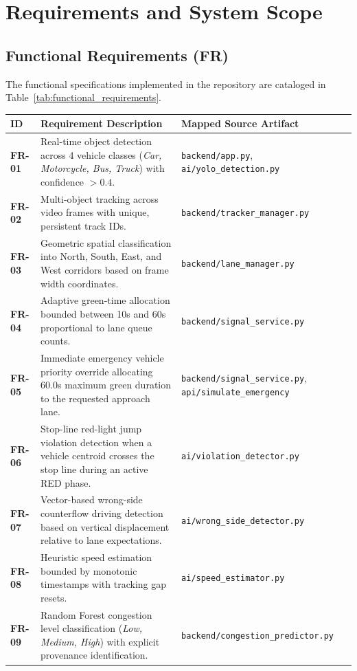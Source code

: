 \chapter{Requirements and System Scope}

\section{Functional Requirements (FR)}
The functional specifications implemented in the repository are cataloged in Table~\ref{tab:functional_requirements}.

\begin{table}[h!]
\centering
\small
\begin{tabularx}{\textwidth}{l p{7.5cm} X}
\toprule
\textbf{ID} & \textbf{Requirement Description} & \textbf{Mapped Source Artifact} \\
\midrule
\textbf{FR-01} & Real-time object detection across 4 vehicle classes (\textit{Car, Motorcycle, Bus, Truck}) with confidence $> 0.4$. & \texttt{backend/app.py}, \texttt{ai/yolo\_detection.py} \\
\textbf{FR-02} & Multi-object tracking across video frames with unique, persistent track IDs. & \texttt{backend/tracker\_manager.py} \\
\textbf{FR-03} & Geometric spatial classification into North, South, East, and West corridors based on frame width coordinates. & \texttt{backend/lane\_manager.py} \\
\textbf{FR-04} & Adaptive green-time allocation bounded between 10s and 60s proportional to lane queue counts. & \texttt{backend/signal\_service.py} \\
\textbf{FR-05} & Immediate emergency vehicle priority override allocating 60.0s maximum green duration to the requested approach lane. & \texttt{backend/signal\_service.py}, \texttt{api/simulate\_emergency} \\
\textbf{FR-06} & Stop-line red-light jump violation detection when a vehicle centroid crosses the stop line during an active RED phase. & \texttt{ai/violation\_detector.py} \\
\textbf{FR-07} & Vector-based wrong-side counterflow driving detection based on vertical displacement relative to lane expectations. & \texttt{ai/wrong\_side\_detector.py} \\
\textbf{FR-08} & Heuristic speed estimation bounded by monotonic timestamps with tracking gap resets. & \texttt{ai/speed\_estimator.py} \\
\textbf{FR-09} & Random Forest congestion level classification (\textit{Low, Medium, High}) with explicit provenance identification. & \texttt{backend/congestion\_predictor.py} \\

\end{tabularx}
\end{table}

